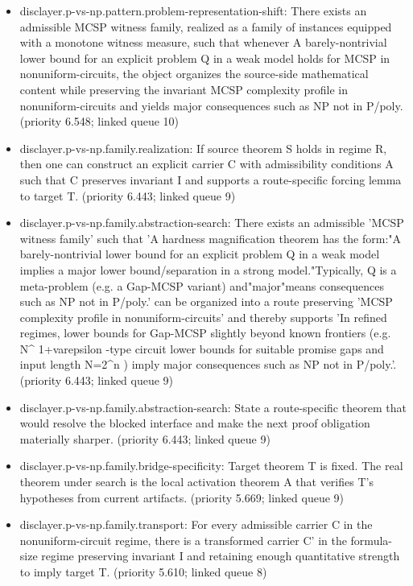 \documentclass[11pt]{article}
\begin{document}
\begin{itemize}
\item disclayer.p-vs-np.pattern.problem-representation-shift: There exists an admissible MCSP witness family, realized as a family of instances equipped with a monotone witness measure, such that whenever A barely-nontrivial lower bound for an explicit problem Q in a weak model holds for MCSP in nonuniform-circuits, the object organizes the source-side mathematical content while preserving the invariant MCSP complexity profile in nonuniform-circuits and yields major consequences such as NP not in P/poly. (priority 6.548; linked queue 10)
\item disclayer.p-vs-np.family.realization: If source theorem S holds in regime R, then one can construct an explicit carrier C with admissibility conditions A such that C preserves invariant I and supports a route-specific forcing lemma to target T. (priority 6.443; linked queue 9)
\item disclayer.p-vs-np.family.abstraction-search: There exists an admissible 'MCSP witness family' such that 'A hardness magnification theorem has the form:"A barely-nontrivial lower bound for an explicit problem Q in a weak model implies a major lower bound/separation in a strong model."Typically, Q is a meta-problem (e.g. a Gap-MCSP variant) and"major"means consequences such as NP not in P/poly.' can be organized into a route preserving 'MCSP complexity profile in nonuniform-circuits' and thereby supports 'In refined regimes, lower bounds for Gap-MCSP slightly beyond known frontiers (e.g. N\textasciicircum{} 1+varepsilon -type circuit lower bounds for suitable promise gaps and input length N=2\textasciicircum{}n ) imply major consequences such as NP not in P/poly.'. (priority 6.443; linked queue 9)
\item disclayer.p-vs-np.family.abstraction-search: State a route-specific theorem that would resolve the blocked interface and make the next proof obligation materially sharper. (priority 6.443; linked queue 9)
\item disclayer.p-vs-np.family.bridge-specificity: Target theorem T is fixed. The real theorem under search is the local activation theorem A that verifies T's hypotheses from current artifacts. (priority 5.669; linked queue 9)
\item disclayer.p-vs-np.family.transport: For every admissible carrier C in the nonuniform-circuit regime, there is a transformed carrier C' in the formula-size regime preserving invariant I and retaining enough quantitative strength to imply target T. (priority 5.610; linked queue 8)

\end{itemize}
\end{document}
